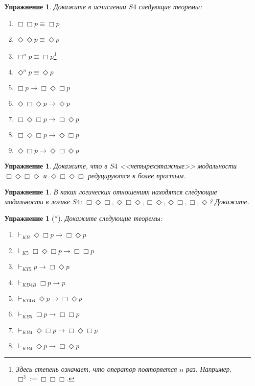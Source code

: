 \documentclass[11pt]{article}
\newtheorem{exercise}[theorem]{Упражнение}
\begin{document}
\begin{exercise}
Докажите в исчислении $S4$ следующие теоремы:
\begin{multicols}{3}
	\begin{enumerate}
		\item $\Box \Box p \equiv \Box p$
		\item $\Diamond \Diamond p \equiv \Diamond p$
		\item $\Box^n p \equiv \Box p$\footnote{Здесь степень означает, что оператор повторяется $n$ раз. Например, $\Box^3:= \Box \Box \Box$.}
		\item  $\Diamond^n p \equiv \Diamond p$
		\item $\Box p \to \Box \Diamond \Box p $
		\item $\Diamond \Box \Diamond p \to \Diamond p$
		\item $\Box \Diamond \Box p \to \Box \Diamond p$
	   \item $\Box \Diamond \Box p \to \Diamond \Box p$
		\item $\Diamond \Box p \to \Diamond \Box \Diamond p$
	\end{enumerate}
\end{multicols}
\end{exercise}

\begin{exercise}
	Докажите, что в $S4$ <<четырехэтажные>> модальности $\Box \Diamond \Box \Diamond$ и $\Diamond \Box \Diamond \Box$ редуцируются к более простым.
\end{exercise}

\begin{exercise}
	В каких логических отношениях находятся следующие модальности в логике $S4$: $\Box \Diamond \Box, \Diamond \Box \Diamond, \Box \Diamond, \Diamond \Box, \Box, \Diamond$? Докажите. 
\end{exercise}

\begin{exercise}[*] Докажите следующие теоремы:
\begin{multicols}{2}
\begin{enumerate}
	\item $\vdash_{KB} \Diamond \Box p \to \Box \Diamond p$
 	\item $\vdash_{K5} \Box \Diamond \Box p \to \Box \Box p$
	\item $\vdash_{KT5} p \to \Box \Diamond p$
	\item $\vdash_{KD4B} \Box p \to p $
	\item $\vdash_{KT4B} \Diamond p \to \Box \Diamond p$
	\item $\vdash_{KB5} \Box p \to \Box \Box p $
    \item $\vdash_{KB4} \Diamond \Box p \to \Box \Diamond \Box p$
	\item $\vdash_{KB4} \Diamond p \to \Box \Diamond p $
    \end{enumerate}
\end{multicols}
\end{exercise}
\end{document}
